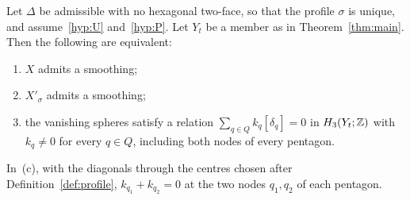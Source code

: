 \begin{corollary}\label{cor:mixed}
Let $\Delta$ be admissible with no hexagonal two-face, so that the profile $\sigma$ is unique, and assume~\ref{hyp:U}
and~\ref{hyp:P}. Let $Y_t$ be a member as in Theorem~\ref{thm:main}. Then the following are equivalent:
\begin{enumerate}
\item[(a)] $X$ admits a smoothing;
\item[(b)] $X'_\sigma$ admits a smoothing;
\item[(c)] the vanishing spheres satisfy a relation $\sum_{q\in Q}k_q[\delta_q]=0$ in $H_3(Y_t;\mathbb Z)$ with $k_q\neq0$ for
every $q\in Q$, including both nodes of every pentagon.
\end{enumerate}
In~(c), with the diagonals through the centres chosen after Definition~\ref{def:profile}, $k_{q_1}+k_{q_2}=0$ at the two
nodes $q_1,q_2$ of each pentagon.
\end{corollary}

